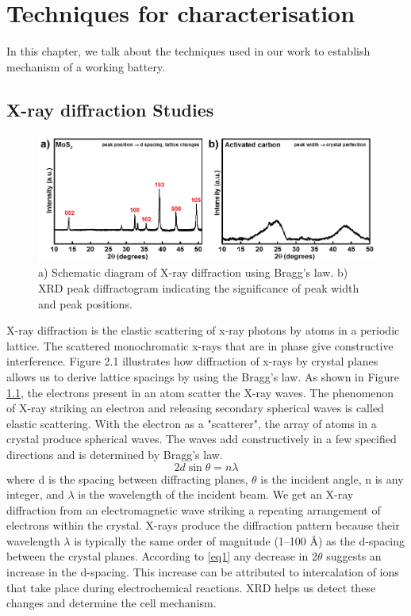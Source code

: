 \chapter{Techniques for characterisation} %
In this chapter, we talk about the techniques used in our work to establish mechanism of a working battery. 
\label{chap2} %
\section{X-ray diffraction Studies}
\begin{figure}[tbh!]
\centering
\includegraphics[width=\textwidth]{Figures/chap2fig/XRD}
\caption{a) Schematic diagram of X-ray diffraction using Bragg's law. b) XRD peak diffractogram indicating the significance of peak width and peak positions.}
\label{Figures/chap2fig:XRD}
\end{figure}
X-ray diffraction is the elastic scattering of x-ray photons by atoms in a periodic lattice. The scattered monochromatic x-rays that are in phase give constructive interference. Figure 2.1 illustrates how diffraction of x-rays by crystal planes allows us to derive lattice spacings by using the Bragg's law. As shown in Figure \ref{Figures/chap2fig:XRD}, the electrons present in an atom scatter the X-ray waves. The phenomenon of X-ray striking an electron and releasing secondary spherical waves is called elastic scattering. With the electron as a "scatterer", the array of atoms in a crystal produce spherical waves. The waves add constructively in a few specified directions  and is determined by Bragg's law.
 \begin{equation} \label{eq1}
     2d\sin\theta = n{\lambda}
 \end{equation}
where d is the spacing between diffracting planes, $\theta$ is the incident angle, n is any integer, and $\lambda$ is the wavelength of the incident beam. We get an X-ray diffraction from an electromagnetic wave striking a repeating arrangement of electrons within the crystal. X-rays produce the diffraction pattern because their wavelength $\lambda$ is typically the same order of magnitude (1–100 \AA ) as the d-spacing between the crystal planes. According to \ref{eq1} any decrease in 2$\theta$ suggests an increase in the d-spacing. This increase can be attributed to intercalation of ions that take place during electrochemical reactions. XRD helps us detect these changes and determine the cell mechanism.

